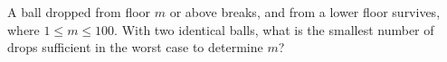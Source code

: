 A ball dropped from floor $m$ or above breaks, and from a lower floor survives, where $1\le m\le100$. With two identical balls, what is the smallest number of drops sufficient in the worst case to determine $m$?
